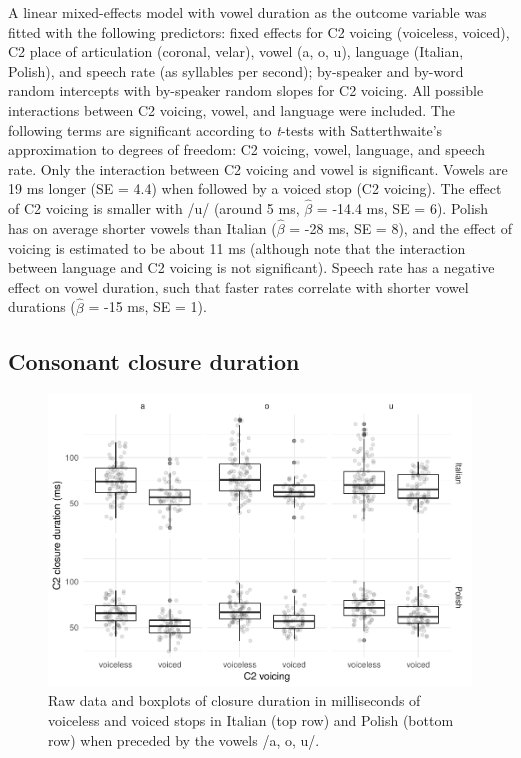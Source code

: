 \documentclass[12pt,]{article}
\begin{document}
A linear mixed-effects model with vowel duration as the outcome variable
was fitted with the following predictors: fixed effects for C2 voicing
(voiceless, voiced), C2 place of articulation (coronal, velar), vowel
(a, o, u), language (Italian, Polish), and speech rate (as syllables per
second); by-speaker and by-word random intercepts with by-speaker random
slopes for C2 voicing. All possible interactions between C2 voicing,
vowel, and language were included. The following terms are significant
according to \emph{t}-tests with Satterthwaite's approximation to
degrees of freedom: C2 voicing, vowel, language, and speech rate. Only
the interaction between C2 voicing and vowel is significant. Vowels are
19 ms longer (SE = 4.4) when followed by a voiced stop (C2 voicing). The
effect of C2 voicing is smaller with /u/ (around 5 ms, \(\hat{\beta}\) =
-14.4 ms, SE = 6). Polish has on average shorter vowels than Italian
(\(\hat{\beta}\) = -28 ms, SE = 8), and the effect of voicing is
estimated to be about 11 ms (although note that the interaction between
language and C2 voicing is not significant). Speech rate has a negative
effect on vowel duration, such that faster rates correlate with shorter
vowel durations (\(\hat{\beta}\) = -15 ms, SE = 1).

\hypertarget{consonant-closure-duration}{%
\subsection{Consonant closure
duration}\label{consonant-closure-duration}}

\label{s:cduration}

\begin{figure}
\includegraphics[width=\linewidth]{2018-relrel_files/figure-latex/Figure3} \caption{Raw data and boxplots of closure duration in milliseconds of voiceless and voiced stops in Italian (top row) and Polish (bottom row) when preceded by the vowels /a, o, u/.}\label{f:Figure3}
\end{figure}
\end{document}
